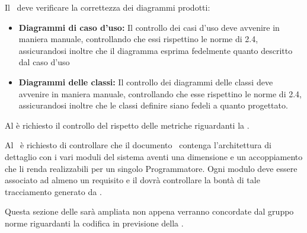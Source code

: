 \documentclass[12pt,a4paper]{article}
\begin{document}
\label{verificaUML}
\TODO{}
Il \VR\ deve verificare la correttezza dei diagrammi  prodotti:
\begin{itemize}
	\item \textbf{Diagrammi di caso d'uso:} Il controllo dei casi d'uso deve avvenire in maniera manuale, controllando che essi rispettino le norme di 2.4, assicurandosi inoltre che il diagramma esprima fedelmente quanto descritto dal caso d'uso
	\item \textbf{Diagrammi delle classi:} Il controllo dei diagrammi delle classi deve avvenire in maniera manuale, controllando che esse rispettino le norme di 2.4, assicurandosi inoltre che le classi definire siano fedeli a quanto progettato.
\end{itemize}

\label{verificaProgettazioneArchitetturale}
Al \VR{} è richiesto il controllo del rispetto delle metriche riguardanti la \FPA{}. 

\label{verificaProgettazioneDiDettaglio}
Al \VR\ è richiesto di controllare che il documento \DP\ contenga
l’architettura di dettaglio con i vari moduli del sistema aventi una dimensione e un accoppiamento che li renda realizzabili per un singolo Programmatore.
Ogni modulo deve essere associato ad almeno un requisito e il \VR dovrà controllare la bontà di tale tracciamento generato da .

\label{verificaCodice}
\TODO{}
Questa sezione delle \NdP{} sarà ampliata non appena verranno concordate dal gruppo norme riguardanti la codifica in previsione della \RQ.
\end{document}
